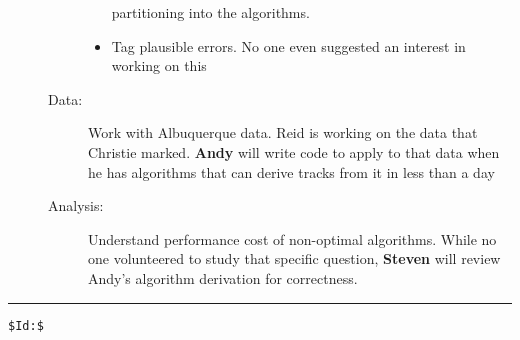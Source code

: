 \documentclass{article}
\begin{document}
\begin{description}
\begin{description}
\begin{itemize}
      partitioning into the algorithms.
    \item Tag plausible errors.  No one even suggested an interest in
      working on this
    \end{itemize}
  \item[Data:] Work with Albuquerque data.  Reid is working on the
    data that Christie marked.  \textbf{Andy} will write code to apply
    to that data when he has algorithms that can derive tracks from it
    in less than a day
  \item[Analysis:] Understand performance cost of non-optimal
    algorithms.  While no one volunteered to study that specific
    question, \textbf{Steven} will review Andy's algorithm derivation
    for correctness.
  \end{description}
\end{description}

\vfill \hrule
\begin{verbatim}
$Id:$
\end{verbatim}
\end{document}
